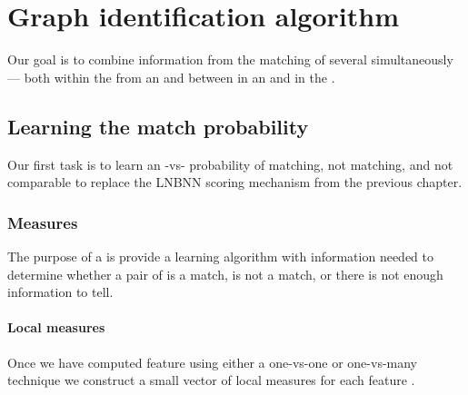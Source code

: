 \section{Graph identification algorithm}
    Our goal is to combine information from the matching of several \annots{} simultaneously --- both within the
      \annots{} from an \occurrence{} and between \annots{} in an \occurrence{} and \annots{} in the \masterdatabase{}.
    
    \subsection{Learning the match probability}
        Our first task is to learn an \annot{}-vs-\annot{} probability of matching, not matching, and not comparable
          to replace the LNBNN scoring mechanism from the previous chapter.
        
        \subsubsection{Measures}
            The purpose of a \matchvec{} is provide a learning algorithm with information needed to determine whether
              a pair of \annots{} is a match, is not a match, or there is not enough information to tell.
            
            \paragraph{Local measures}
            Once we have computed feature \correspondences{} using either a one-vs-one or one-vs-many technique we
              construct a small vector of local measures for each feature \correspondence{}.
            

